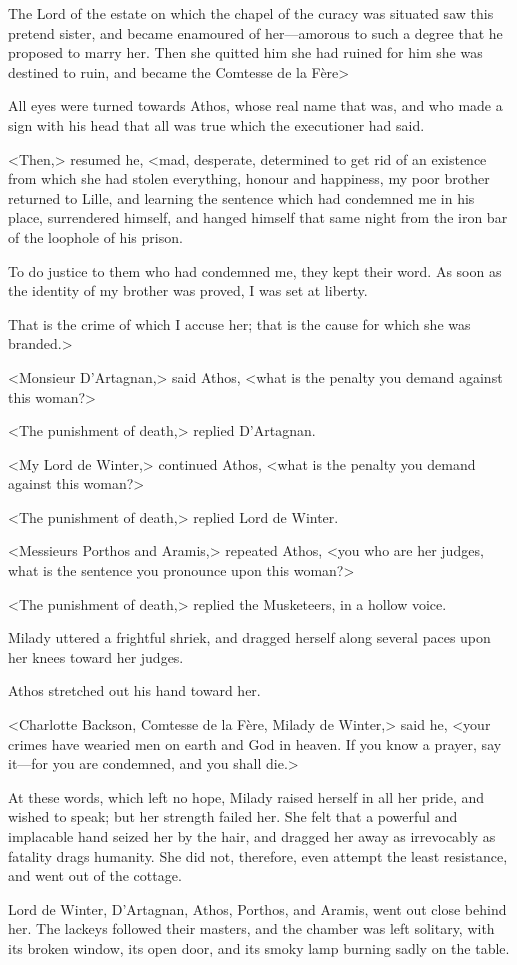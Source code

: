 The Lord of the estate on which the chapel of the curacy was situated saw this pretend sister, and became enamoured of her—amorous to such a degree that he proposed to marry her. Then she quitted him she had ruined for him she was destined to ruin, and became the Comtesse de la Fère\longdash> 

All eyes were turned towards Athos, whose real name that was, and who made a sign with his head that all was true which the executioner had said. 

<Then,> resumed he, <mad, desperate, determined to get rid of an existence from which she had stolen everything, honour and happiness, my poor brother returned to Lille, and learning the sentence which had condemned me in his place, surrendered himself, and hanged himself that same night from the iron bar of the loophole of his prison. 

To do justice to them who had condemned me, they kept their word. As soon as the identity of my brother was proved, I was set at liberty. 

That is the crime of which I accuse her; that is the cause for which she was branded.> 

<Monsieur D'Artagnan,> said Athos, <what is the penalty you demand against this woman?> 

<The punishment of death,> replied D'Artagnan. 

<My Lord de Winter,> continued Athos, <what is the penalty you demand against this woman?> 

<The punishment of death,> replied Lord de Winter. 

<Messieurs Porthos and Aramis,> repeated Athos, <you who are her judges, what is the sentence you pronounce upon this woman?> 

<The punishment of death,> replied the Musketeers, in a hollow voice. 

Milady uttered a frightful shriek, and dragged herself along several paces upon her knees toward her judges. 

Athos stretched out his hand toward her. 

<Charlotte Backson, Comtesse de la Fère, Milady de Winter,> said he, <your crimes have wearied men on earth and God in heaven. If you know a prayer, say it—for you are condemned, and you shall die.> 

At these words, which left no hope, Milady raised herself in all her pride, and wished to speak; but her strength failed her. She felt that a powerful and implacable hand seized her by the hair, and dragged her away as irrevocably as fatality drags humanity. She did not, therefore, even attempt the least resistance, and went out of the cottage. 

Lord de Winter, D'Artagnan, Athos, Porthos, and Aramis, went out close behind her. The lackeys followed their masters, and the chamber was left solitary, with its broken window, its open door, and its smoky lamp burning sadly on the table.